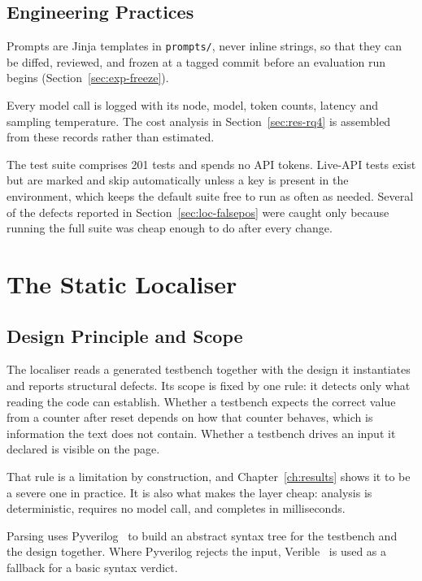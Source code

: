 \documentclass[11pt,a4paper,titlepage=false]{scrreprt}
\begin{document}
\section{Engineering Practices}\label{sec:design-practices}

Prompts are Jinja templates in \texttt{prompts/}, never inline strings, so that they can be
diffed, reviewed, and frozen at a tagged commit before an evaluation run begins
(Section~\ref{sec:exp-freeze}).

Every model call is logged with its node, model, token counts, latency and sampling
temperature. The cost analysis in Section~\ref{sec:res-rq4} is assembled from these records
rather than estimated.

The test suite comprises 201 tests and spends no API tokens. Live-API tests exist but are
marked and skip automatically unless a key is present in the environment, which keeps the
default suite free to run as often as needed. Several of the defects reported in
Section~\ref{sec:loc-falsepos} were caught only because running the full suite was cheap
enough to do after every change.

\chapter{The Static Localiser}\label{ch:localiser}

\section{Design Principle and Scope}\label{sec:loc-principle}

The localiser reads a generated testbench together with the design it instantiates and
reports structural defects. Its scope is fixed by one rule: it detects only what reading
the code can establish. Whether a testbench expects the correct value from a counter after
reset depends on how that counter behaves, which is information the text does not contain.
Whether a testbench drives an input it declared is visible on the page.

That rule is a limitation by construction, and Chapter~\ref{ch:results} shows it to be a
severe one in practice. It is also what makes the layer cheap: analysis is deterministic,
requires no model call, and completes in milliseconds.

Parsing uses Pyverilog~\cite{takamaeda2015pyverilog} to build an abstract syntax tree for
the testbench and the design together. Where Pyverilog rejects the input,
Verible~\cite{verible} is used as a fallback for a basic syntax verdict.
\end{document}
